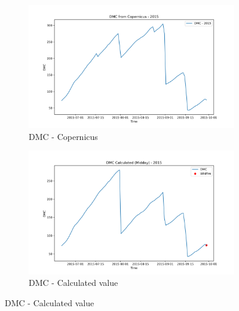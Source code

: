 \begin{figure}[h]
\caption{Comparison of DMC calculated values and Copernicus at midday}
    \centering
    \begin{subfigure}{0.49\textwidth}
        \centering
        \includegraphics[width=\textwidth]{graphs/2015/2015CopernicusDMC12.png}
        \caption{DMC - Copernicus}
        \label{fig:dmc_copernicus_2015_midday}
    \end{subfigure}
    \hfill
    \begin{subfigure}{0.49\textwidth}
        \centering
        \includegraphics[width=\textwidth]{graphs/2015/2015CalcDMC12.png}
        \caption{DMC - Calculated value}
        \label{fig:dmc_calculated_2015_midday}
    \end{subfigure}
    \label{fig:comparison_dmc_midday_copernicus_calculated}
\end{figure}

